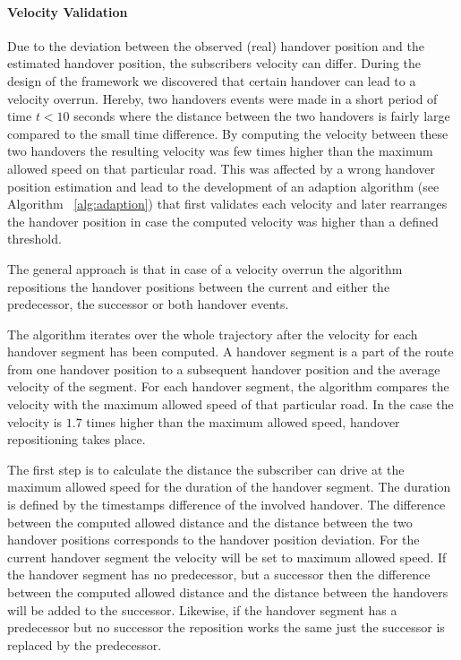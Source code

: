\documentclass[twocolumn]{bmcart}%
\begin{document}
\paragraph{Velocity Validation}
Due to the deviation between the observed (real) handover position and the estimated handover position, the subscribers velocity can differ. During the design of the framework we discovered that certain handover can lead to a velocity overrun. Hereby, two handovers events were made in a short period of time $t<10$ seconds where the distance between the two handovers is fairly large compared to the small time difference. By computing the velocity between these two handovers the resulting velocity was few times higher than the maximum allowed speed on that particular road. This was affected by a wrong handover position estimation and lead to the development of an adaption algorithm (see Algorithm ~\ref{alg:adaption}) that first validates each velocity and later rearranges the handover position in case the computed velocity was higher than a defined threshold. 

The general approach is that in case of a velocity overrun the algorithm repositions the handover positions between the current and either the predecessor, the successor or both handover events.

The algorithm iterates over the whole trajectory after the velocity for each handover segment has been computed. A handover segment is a part of the route from one handover position to a subsequent handover position and the average velocity of the segment. For each handover segment, the algorithm compares the velocity with the maximum allowed speed of that particular road. In the case the velocity is $1.7$ times higher than the maximum allowed speed, handover repositioning takes place. 

The first step is to calculate the distance the subscriber can drive at the maximum allowed speed for the duration of the handover segment. The duration is defined by the timestamps difference of the involved handover. The difference between the computed allowed distance and the distance between the two handover positions corresponds to the handover position deviation. For the current handover segment the velocity will be set to maximum allowed speed. If the handover segment has no predecessor, but a successor then the difference between the computed allowed distance and the distance between the handovers will be added to the successor. Likewise, if the handover segment has a predecessor but no successor the reposition works the same just the successor is replaced by the predecessor. 
\end{document}
